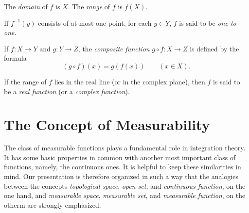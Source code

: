 \documentclass[a4paper,12pt,twoside,openany]{book}
\begin{document}
The \textit{domain} of $f$ is $X$. The \textit{range} of $f$ is $f(X)$.

If $f^{-1}(y)$ consists of at most one point, for each $y\in Y$, $f$ is said to be \textit{one-to-one}.

If $f:X\to Y$ and $g:Y\to Z$, the \textit{composite function} $g\circ f:X\to Z$ is defined by the formula $$(g\circ f)(x)=g(f(x))\qquad(x\in X).$$

If the range of $f$ lies in the real line (or in the complex plane), then $f$ is said to be a \textit{real function} (or a \textit{complex function}).

\section{The Concept of Measurability}

The class of measurable functions plays a fundamental role in integration theory. It has some basic properties in common with another most important class of functions, namely, the continuous ones. It is helpful to keep these similarities in mind. Our presentation is therefore organized in such a way that the analogies between the concepts \textit{topological space}, \textit{open set}, and \textit{continuous function}, on the one hand, and \textit{measurable space}, \textit{measurable set}, and \textit{measurable function}, on the otherm are strongly emphasized.

\end{document}
